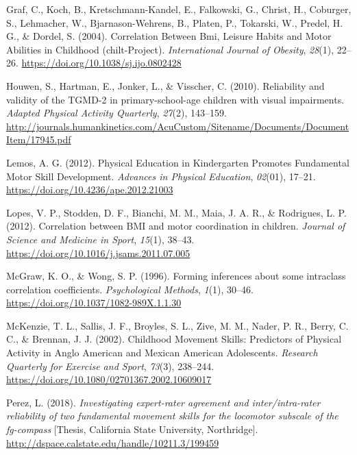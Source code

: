 \documentclass[
  man,
  colorlinks=true,linkcolor=blue,citecolor=blue,urlcolor=blue]{apa7}
\newlength{\cslhangindent}
\newlength{\cslentryspacingunit} %
\newenvironment{CSLReferences}[2] %
 {%
  \setlength{\parindent}{0pt}
  \ifodd #1
  \let\oldpar\par
  \def\par{\hangindent=\cslhangindent\oldpar}
  \fi
  \setlength{\parskip}{#2\cslentryspacingunit}
 }%
 {}
\begin{document}
\begin{CSLReferences}{1}{0}
\leavevmode{}%
Graf, C., Koch, B., Kretschmann-Kandel, E., Falkowski, G., Christ, H.,
Coburger, S., Lehmacher, W., Bjarnason-Wehrens, B., Platen, P.,
Tokarski, W., Predel, H. G., \& Dordel, S. (2004). Correlation {Between
Bmi}, {Leisure Habits} and {Motor Abilities} in {Childhood}
(chilt-{Project}). \emph{International Journal of Obesity},
\emph{28}(1), 22--26. \url{https://doi.org/10.1038/sj.ijo.0802428}

\leavevmode{}%
Houwen, S., Hartman, E., Jonker, L., \& Visscher, C. (2010). Reliability
and validity of the {TGMD-2} in primary-school-age children with visual
impairments. \emph{Adapted Physical Activity Quarterly}, \emph{27}(2),
143--159.
\url{http://journals.humankinetics.com/AcuCustom/Sitename/Documents/DocumentItem/17945.pdf}

\leavevmode{}%
Lemos, A. G. (2012). Physical {Education} in {Kindergarten Promotes
Fundamental Motor Skill Development}. \emph{Advances in Physical
Education}, \emph{02}(01), 17--21.
\url{https://doi.org/10.4236/ape.2012.21003}

\leavevmode{}%
Lopes, V. P., Stodden, D. F., Bianchi, M. M., Maia, J. A. R., \&
Rodrigues, L. P. (2012). Correlation between {BMI} and motor
coordination in children. \emph{Journal of Science and Medicine in
Sport}, \emph{15}(1), 38--43.
\url{https://doi.org/10.1016/j.jsams.2011.07.005}

\leavevmode{}%
McGraw, K. O., \& Wong, S. P. (1996). Forming inferences about some
intraclass correlation coefficients. \emph{Psychological Methods},
\emph{1}(1), 30--46. \url{https://doi.org/10.1037/1082-989X.1.1.30}

\leavevmode{}%
McKenzie, T. L., Sallis, J. F., Broyles, S. L., Zive, M. M., Nader, P.
R., Berry, C. C., \& Brennan, J. J. (2002). Childhood {Movement Skills}:
{Predictors} of {Physical Activity} in {Anglo American} and {Mexican
American Adolescents}. \emph{Research Quarterly for Exercise and Sport},
\emph{73}(3), 238--244.
\url{https://doi.org/10.1080/02701367.2002.10609017}

\leavevmode{}%
Perez, L. (2018). \emph{Investigating expert-rater agreement and
inter/intra-rater reliability of two fundamental movement skills for the
locomotor subscale of the fg-compass} {[}Thesis, {California State
University, Northridge}{]}.
\url{http://dspace.calstate.edu/handle/10211.3/199459}


\end{CSLReferences}
\end{document}

